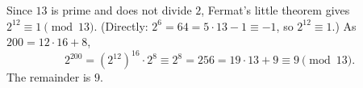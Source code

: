 Since $13$ is prime and does not divide $2$, Fermat's little theorem gives $2^{12}\equiv1\pmod{13}$. (Directly: $2^6=64=5\cdot13-1\equiv-1$, so $2^{12}\equiv1$.) As $200=12\cdot16+8$,
\[
2^{200}=\left(2^{12}\right)^{16}\cdot2^8\equiv2^8=256=19\cdot13+9\equiv9\pmod{13}.
\]
The remainder is $\boxed{9}$.
